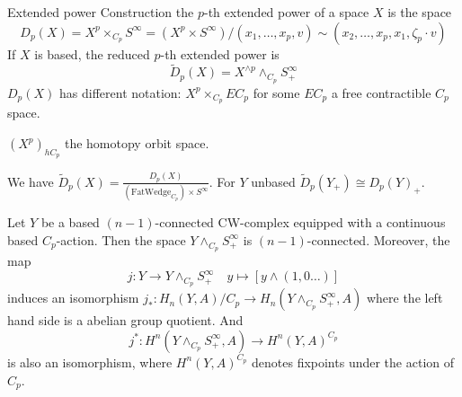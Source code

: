 \documentclass[language=english]{TemplateLecture}
\begin{document}
\begin{defi}{Extended power Construction}{}
    the \(p\)-th extended power of a space \(X\) is the space
    \[D_p(X) = X^p\times_{C_p} S^\infty= (X^p\times S^\infty)/(x_1,\dots, x_p, v)\sim (x_2, \dots, x_p, x_1, \zeta_p\cdot v)\]
    If \(X\) is based, the reduced \(p\)-th extended power is
    \[\tilde D_p(X) = X^{\wedge p}\wedge_{C_p} S^\infty_+\]
    \(D_p(X)\) has different notation: \(X^p\times _{C_p} EC_p\) for some \(EC_p\) a free contractible \(C_p\) space.

    \((X^p)_{hC_p}\) the homotopy orbit space.
\end{defi}

We have \(\tilde D_p(X) = \frac{D_p(X)}{(\mathrm{FatWedge}_{C_p})\times S^\infty}\). For \(Y\) unbased \(\tilde D_p(Y_+) \cong D_p(Y)_+\).

\begin{proposition}
    Let \(Y\) be a based \((n-1)\)-connected CW-complex equipped with a continuous based \(C_p\)-action. Then the space \(Y\wedge_{C_p}S^\infty_+\) is \((n-1)\)-connected. Moreover, the map
    \[j\colon Y\to Y\wedge_{C_p}S^\infty_+ \quad y\mapsto [y\wedge (1,0\dots)]\]
    induces an isomorphism \(j_*\colon H_n(Y, A)/C_p\to H_n(Y\wedge_{C_p}S^\infty_+, A)\)
    where the left hand side is a abelian group quotient. And
    \[j^*\colon H^n(Y\wedge_{C_p} S^\infty_+, A)\to H^n(Y, A)^{C_p}\]
    is also an isomorphism, where \(H^n(Y,A)^{C_p}\) denotes fixpoints under the action of \(C_p\).
\end{proposition}
\end{document}
